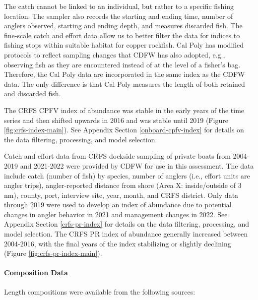 \documentclass[11pt,
  english,
  letterpaper,
]{article}
\begin{document}
The catch cannot be linked to an individual, but rather to a specific fishing location. The sampler also records the starting and ending time, number of anglers observed, starting and ending depth, and measures discarded fish. The fine-scale catch and effort data allow us to better filter the data for indices to fishing stops within suitable habitat for copper rockfish. Cal Poly has modified protocols to reflect sampling changes that CDFW has also adopted, e.g., observing fish as they are encountered instead of at the level of a fisher's bag. Therefore, the Cal Poly data are incorporated in the same index as the CDFW data. The only difference is that Cal Poly measures the length of both retained and discarded fish.

The CRFS CPFV index of abundance was stable in the early years of the time series and then shifted upwards in 2016 and was stable until 2019 (Figure \ref{fig:crfs-index-main}). See Appendix Section \ref{onboard-cpfv-index} for details on the data filtering, processing, and model selection.

Catch and effort data from CRFS dockside sampling of private boats from 2004-2019 and 2021-2022 were provided by CDFW for use in this assessment. The data include catch (number of fish) by species, number of anglers (i.e., effort units are angler trips), angler-reported distance from shore (Area X: inside/outside of 3 nm), county, port, interview site, year, month, and CRFS district. Only data through 2019 were used to develop an index of abundance due to potential changes in angler behavior in 2021 and management changes in 2022. See Appendix Section \ref{crfs-pr-index} for details on the data filtering, processing, and model selection. The CRFS PR index of abundance generally increased between 2004-2016, with the final years of the index stabilizing or slightly declining (Figure \ref{fig:crfs-pr-index-main}).

\hypertarget{composition-data-1}{%
\paragraph{Composition Data}\label{composition-data-1}}

\hfill\break

Length compositions were available from the following sources:
\end{document}
